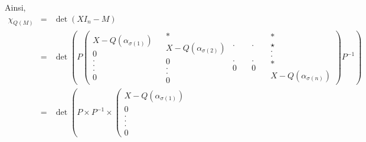 Ainsi,
\begin{eqnarray*}
  \chi_{Q (M)} & = & \det (X I_n - M)\\
  & = & \det \left( P \left( \begin{array}{c}
    X - Q (\alpha_{\sigma (1)})\\
    0\\
    .\\
    .\\
    .\\
    0
  \end{array} \begin{array}{c}
    \\
    
  \end{array} \begin{array}{c}
    \ast\\
    X - Q (\alpha _{\sigma (2)})\\
    0\\
    .\\
    .\\
    0
  \end{array}  \begin{array}{c}
    .\\
    \\
    \\
    \\
    .\\
    0
  \end{array} \quad \begin{array}{c}
    .\\
    \\
    \\
    \\
    .\\
    0
  \end{array} \quad \begin{array}{l}
    \ast\\
    \star\\
    .\\
    .\\
    \ast\\
    X - Q (\alpha _{\sigma (n)})
  \end{array} \right) P^{- 1} \right)\\
  & = & \det \left( P \times P^{- 1} \times \left( \begin{array}{c}
    X - Q (\alpha_{\sigma (1)})\\
    0\\
    .\\
    .\\
    .\\
    0
  \end{array} \begin{array}{c}
    \\
    

\end{array}
\end{eqnarray*}
